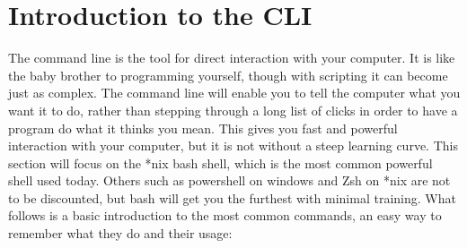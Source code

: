 	\section{Introduction to the CLI}
		The command line is the tool for direct interaction with your computer. 
		It is like the baby brother to programming yourself, though with scripting it can become just as complex. 
		The command line will enable you to tell the computer what you want it to do, rather than stepping through a long list of clicks in order to have a program do what it thinks you mean. 
		This gives you fast and powerful interaction with your computer, but it is not without a steep learning curve. 
		This section will focus on the \**nix bash shell, which is the most common powerful shell used today. 
		Others such as powershell on windows and Zsh on \**nix are not to be discounted, but bash will get you the furthest with minimal training.\cite{CLICrashCourse}
		What follows is a basic introduction to the most common commands, an easy way to remember what they do and their usage:
